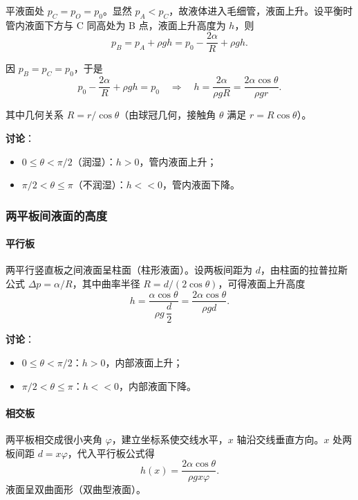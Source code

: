 \documentclass[UTF8]{ctexart}
\theoremstyle{definition}
\begin{document}
平液面处 $p_C=p_O=p_0$。显然 $p_A<p_C$，故液体进入毛细管，液面上升。设平衡时管内液面下方与 C 同高处为 B 点，液面上升高度为 $h$，则
\begin{equation}
p_B = p_A + \rho gh = p_0 - \frac{2\alpha}{R} + \rho gh.
\end{equation}

因 $p_B=p_C=p_0$，于是
\begin{equation}
p_0 - \frac{2\alpha}{R} + \rho gh = p_0
\quad\Rightarrow\quad
\boxed{h = \frac{2\alpha}{\rho gR} = \frac{2\alpha\cos\theta}{\rho gr}}.
\end{equation}

其中几何关系 $R = r/\cos\theta$（由球冠几何，接触角 $\theta$ 满足 $r=R\cos\theta$）。

\textbf{讨论}：
\begin{itemize}
\item $0\le\theta<\pi/2$（润湿）：$h>0$，管内液面上升；
\item $\pi/2<\theta\le\pi$（不润湿）：$h<<0$，管内液面下降。
\end{itemize}


\subsubsection*{两平板间液面的高度}

\paragraph{平行板}

两平行竖直板之间液面呈柱面（柱形液面）。设两板间距为 $d$，由柱面的拉普拉斯公式 $\Delta p = \alpha/R$，其中曲率半径 $R = d/(2\cos\theta)$，可得液面上升高度
\begin{equation}
\boxed{h = \frac{\alpha\cos\theta}{\rho g\,\dfrac{d}{2}} = \frac{2\alpha\cos\theta}{\rho gd}}.
\end{equation}

\textbf{讨论}：
\begin{itemize}
\item $0\le\theta<\pi/2$：$h>0$，内部液面上升；
\item $\pi/2<\theta\le\pi$：$h<<0$，内部液面下降。
\end{itemize}

\paragraph{相交板}

两平板相交成很小夹角 $\varphi$，建立坐标系使交线水平，$x$ 轴沿交线垂直方向。$x$ 处两板间距 $d=x\varphi$，代入平行板公式得
\begin{equation}
h(x) = \frac{2\alpha\cos\theta}{\rho g x\varphi}.
\end{equation}
液面呈双曲面形（双曲型液面）。
\end{document}
